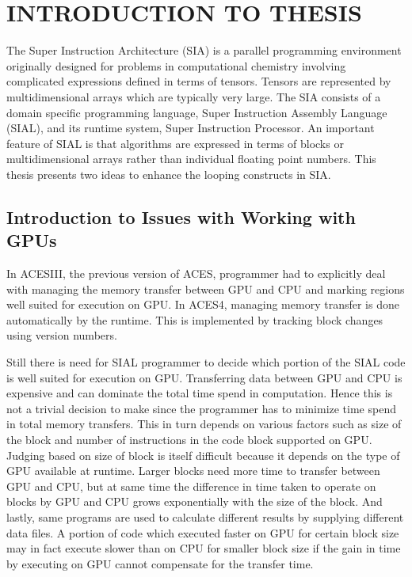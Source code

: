 \chapter{INTRODUCTION TO THESIS}\label{intro}
The Super Instruction Architecture (SIA) is a parallel programming environment
originally designed for problems in computational chemistry involving complicated
expressions defined in terms of tensors. Tensors are represented by
multidimensional arrays which are typically very large. The SIA consists of a
domain specific programming language, Super Instruction Assembly Language
(SIAL), and its runtime system, Super Instruction Processor. An important
feature of SIAL is that algorithms are expressed in terms of blocks or
multidimensional arrays rather than individual floating point numbers. This thesis
presents two ideas to enhance the looping constructs in SIA.

\section{Introduction to Issues with Working with GPUs}
In ACESIII, the previous version of ACES, programmer had to explicitly deal with managing
the memory transfer between GPU and CPU and marking regions well suited for execution
on GPU. In ACES4, managing memory transfer is done automatically by the runtime.
This is implemented by tracking block changes using version numbers.

Still there is need for SIAL programmer to decide which portion of the SIAL code
is well suited for execution on GPU. Transferring data between GPU and CPU is
expensive and can dominate the total time spend in computation. Hence this is not
a trivial decision to make since the programmer has to minimize time spend in
total memory transfers. This in turn depends on various factors such as
size of the block and number of instructions in the code block supported on GPU. Judging
based on size of block is itself difficult because it depends on the type of GPU available
at runtime. Larger blocks need more time to transfer between GPU and CPU, but at
same time the difference in time taken to operate on blocks by GPU and CPU grows
exponentially with the size of the block. And lastly, same programs are used to
calculate different results by supplying different data files. A portion of code
which executed faster on GPU for certain block size may in fact execute slower
than on CPU for smaller block size if the gain in time by executing on GPU cannot
compensate for the transfer time.

